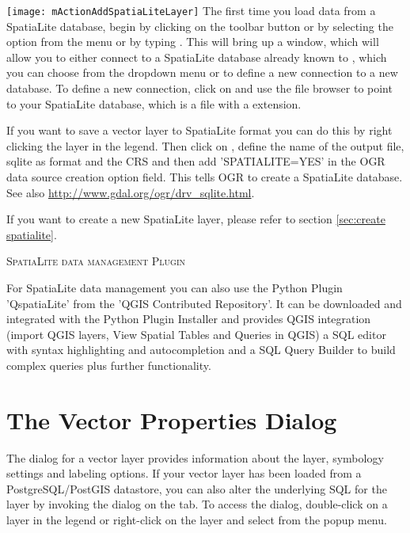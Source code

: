 \texttt{[image: mActionAddSpatiaLiteLayer]}
The first time you load data from a SpatiaLite database, begin by clicking on the
 toolbar button or 
by selecting the 
option from the  menu or by typing .
This will bring up a window, which will allow you to either connect to a SpatiaLite 
database already known to \qg, which you can choose from the dropdown menu or to define 
a new connection to a new database. To define a new connection, click on  and 
use the file browser to point to your SpatiaLite database, which is a file with 
a  extension.

If you want to save a vector layer to SpatiaLite format you can do this by right clicking
the layer in the legend. Then click on , define the name of the output 
file, sqlite as format and the CRS and then add 'SPATIALITE=YES' in the OGR data source 
creation option field. This tells OGR to create a SpatiaLite database. See 
also \url{http://www.gdal.org/ogr/drv_sqlite.html}.


If you want to create a new SpatiaLite layer, please refer to section \ref{sec:create spatialite}.

\begin{Tip}\caption{\textsc{SpatiaLite data management Plugin}} For SpatiaLite data management you can also use the Python Plugin 
'QspatiaLite' from the 'QGIS Contributed Repository'. It can be downloaded and 
integrated with the Python Plugin Installer and provides QGIS integration (import 
QGIS layers, View Spatial Tables and Queries in QGIS) a SQL editor with syntax 
highlighting and autocompletion and a SQL Query Builder to build complex queries 
plus further functionality. 
\end{Tip}

\section{The Vector Properties Dialog}\label{sec:vectorprops}

The  dialog for a vector layer provides information
about the layer, symbology settings and labeling options. If your vector
layer has been loaded from a PostgreSQL/PostGIS datastore, you can also alter
the underlying SQL for the layer by invoking the 
dialog on the  tab.
To access the  dialog, double-click on a layer in
the legend or right-click on the layer and select 
from the popup menu.

